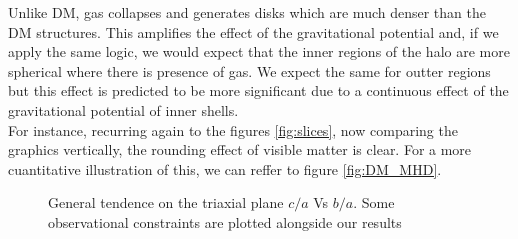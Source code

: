  Unlike DM, gas collapses and generates disks which are much denser than the DM structures. This amplifies the effect of the gravitational potential and, if we apply the same logic, we would expect that the inner regions of the halo are more spherical where there is presence of gas. We expect the same for outter regions but this effect is predicted to be more significant due to a continuous effect of the gravitational potential of inner shells.\\

For instance, recurring again to the figures \ref{fig:slices}, now comparing the graphics vertically, the rounding effect of visible matter is clear. For a more cuantitative illustration of this, we can reffer to figure \ref{fig:DM_MHD}. \\
\begin{figure}[!ht]
  \centering
  \hfill
  \hfill
  \caption{General tendence on the triaxial plane $c/a$ Vs $b/a$. Some observational constraints are plotted alongside our results}
  \label{fig:Triaxiality_DM_MHD}
\end{figure}

